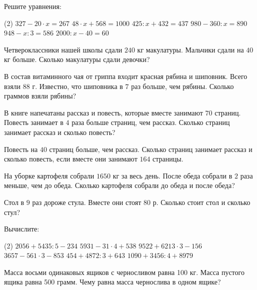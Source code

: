 \begin{class}[number=8]
	\begin{listofex}
		\item Решите уравнения:
		\begin{tasks}(2)
			\task \( 327-20\cdot x=267 \)
			\task \( 48\cdot x+568=1000 \)
			\task \( 425:x+432=437 \)
			\task \( 980-360:x=890 \)
			\task \( 948-x:3=586 \)
			\task \( 2000:x-40=60 \)
		\end{tasks}
		\item Четвероклассники нашей школы сдали \( 240 \) кг макулатуры. Мальчики сдали на \( 40 \) кг больше. Сколько макулатуры сдали девочки?
		\item В состав витаминного чая от гриппа входит красная рябина и шиповник. Всего взяли \( 88 \) г. Известно, что шиповника в \( 7 \) раз больше, чем рябины. Сколько граммов взяли рябины?
		\item В книге напечатаны рассказ и повесть, которые вместе занимают \( 70 \) страниц. Повесть занимает в \( 4 \) раза больше страниц, чем рассказ. Сколько страниц занимает рассказ и сколько повесть?
		\item Повесть на \( 40 \) страниц больше, чем рассказ. Сколько страниц занимает рассказ и сколько повесть, если вместе они занимают \( 164 \) страницы.
		\item На уборке картофеля собрали \( 1650 \) кг за весь день. После обеда собрали в \( 2 \) раза меньше, чем до обеда. Сколько картофеля собрали до обеда и после обеда?
		\item Стол в \( 9 \) раз дороже стула. Вместе они стоят \( 80 \) р. Сколько стоит стол и сколько стул?
	\end{listofex}
\end{class}

\begin{homework}[number=4]
	\begin{listofex}
		\item Вычислите:
		\begin{tasks}(2)
			\task \( 2056 + 5435 : 5 - 234 \)
			\task \( 5931 - 31\cdot 4 + 538 \)
			\task \( 9522 + 6213\cdot 3 - 156 \)
			\task \( 3657 - 561 \cdot 3 - 853 \)
			\task \( 454 + 4872 : 3 + 643 \)
			\task \( 1090 + 3456: 4 + 8979 \)
		\end{tasks}
		\item Масса восьми одинаковых ящиков с черносливом равна 100 кг. Масса пустого ящика равна 500 грамм. Чему равна масса чернослива в одном ящике?
	\end{listofex}
\end{homework}
